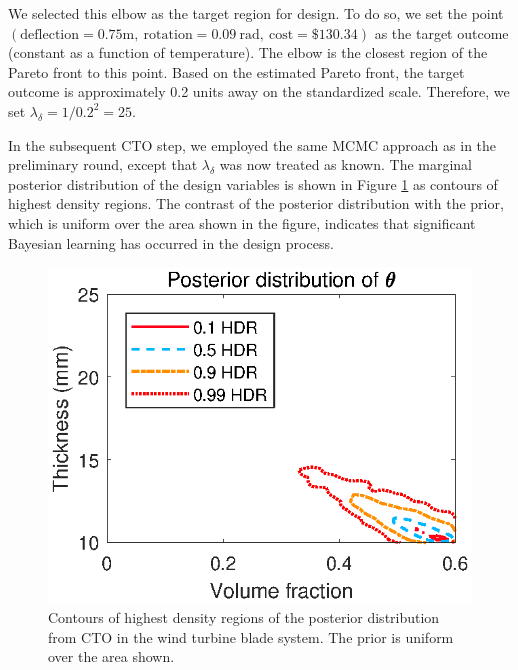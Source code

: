 \documentclass[12pt]{article}
\begin{document}
%
We selected this elbow as the target region for design.
%
To do so, we set the point $(\mathrm{deflection}=0.75\mathrm m,\ 
\mathrm{rotation}=0.09\ \mathrm{rad},\ 
\mathrm{cost}=\$130.34)$
 as the target outcome (constant as a function of temperature).
%
The elbow is the closest region of the Pareto front to this point.
%
Based on the estimated Pareto front, the target outcome is approximately 0.2 units away on the standardized scale.
%
Therefore, we set $\lambda_\delta=1/0.2^2=25.$
%

In the subsequent CTO step, we employed the same MCMC approach as in the preliminary round, except that $\lambda_\delta$ was now treated as known.
%
The marginal posterior distribution of the design variables is shown in Figure \ref{fig:wt_marg_post} as contours of highest density regions.
%
The contrast of the posterior distribution with the prior, which is uniform over the area shown in the figure, indicates that significant Bayesian learning has occurred in the design process.
%
\begin{figure}
\centering
\includegraphics[scale=0.8]{FIG_post_dist_contourplot}
\caption{Contours of highest density regions of the posterior distribution from CTO in the wind turbine blade system. The prior is uniform over the area shown.}
\label{fig:wt_marg_post}
\end{figure}
\end{document}
